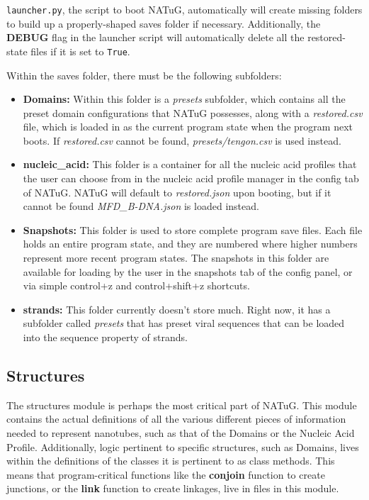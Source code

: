 \documentclass[titlepage]{article}
\begin{document}
	\texttt{launcher.py}, the script to boot NATuG, automatically will create missing folders to build up a properly-shaped saves folder if necessary. Additionally, the \textbf{DEBUG} flag in the launcher script will automatically delete all the restored-state files if it is set to \texttt{True}.
	
	Within the saves folder, there must be the following subfolders:
	\begin{itemize}
		\item \textbf{Domains:} Within this folder is a \textit{presets} subfolder, which contains all the preset domain configurations that NATuG possesses, along with a \textit{restored.csv} file, which is loaded in as the current program state when the program next boots. If \textit{restored.csv} cannot be found, \textit{presets/tengon.csv} is used instead.
		
		\item \textbf{nucleic\_acid:} This folder is a container for all the nucleic acid profiles that the user can choose from in the nucleic acid profile manager in the config tab of NATuG. NATuG will default to \textit{restored.json} upon booting, but if it cannot be found \textit{MFD\_B-DNA.json} is loaded instead.
		
		\item \textbf{Snapshots:} This folder is used to store complete program save files. Each file holds an entire program state, and they are numbered where higher numbers represent more recent program states. The snapshots in this folder are available for loading by the user in the snapshots tab of the config panel, or via simple control+z and control+shift+z shortcuts.
		
		\item \textbf{strands:} This folder currently doesn't store much. Right now, it has a subfolder called \textit{presets} that has preset viral sequences that can be loaded into the sequence property of strands. 
	\end{itemize}
	
	\subsection{Structures}
	The structures module is perhaps the most critical part of NATuG. This module contains the actual definitions of all the various different pieces of information needed to represent nanotubes, such as that of the Domains or the Nucleic Acid Profile. Additionally, logic pertinent to specific structures, such as Domains, lives within the definitions of the classes it is pertinent to as class methods. This means that program-critical functions like the \textbf{conjoin} function to create junctions, or the \textbf{link} function to create linkages, live in files in this module.
	
\end{document}
